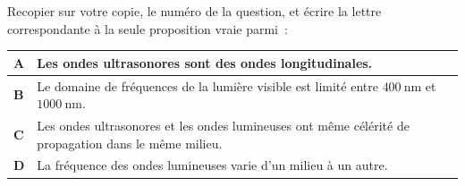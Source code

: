 Recopier sur votre copie, le numéro de la question, et écrire la lettre
correspondante à la seule proposition vraie parmi~:

\begin{table}[H]
    \centering
    \renewcommand{\arraystretch}{1.5}
    \begin{tabularx}{\textwidth}{|p{7mm}|X|}
        \hline
        $\mathbf{A}$ & Les ondes ultrasonores sont des ondes longitudinales. \\
        \hline
        $\mathbf{B}$ & Le domaine de fréquences de la lumière visible est limité
                       entre $\qty{400}{\nm}$ et $\qty{1000}{\nm}$. \\
        \hline
        $\mathbf{C}$ & Les ondes ultrasonores et les ondes lumineuses ont même
                       célérité de propagation dans le même milieu. \\
        \hline
        $\mathbf{D}$ & La fréquence des ondes lumineuses varie d'un milieu à un
                       autre. \\
        \hline
    \end{tabularx}
\end{table}

